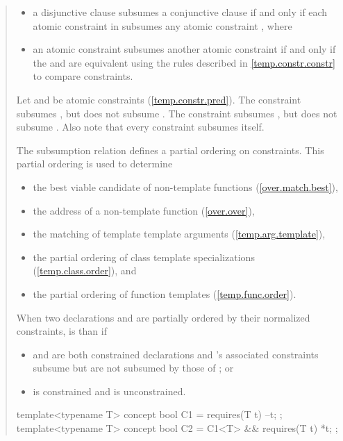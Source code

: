 \begin{quote}
\begin{itemize}
\item a disjunctive clause  subsumes a conjunctive clause
 if and only if each atomic constraint in  subsumes 
any atomic constraint , where

\item an atomic constraint  subsumes another atomic constraint
 if and only if the  and  are equivalent using the
rules described in \ref{temp.constr.constr} to compare constraints.
\end{itemize}
% 
\enterexample
Let  and  be atomic constraints (\ref{temp.constr.pred}).
% 
The constraint  subsumes , 
but  does not subsume . 
% 
The constraint  subsumes , but
 does not subsume . 
% 
Also note that every constraint subsumes itself.
\exitexample


\pnum
The subsumption relation defines a partial ordering on constraints. 
This partial ordering is used to determine
% 
\begin{itemize}
\item the best viable candidate of non-template functions
     (\ref{over.match.best}), 
\item the address of a non-template function
     (\ref{over.over}), 
\item the matching of template template arguments
     (\ref{temp.arg.template}), 
\item the partial ordering of class template specializations
     (\ref{temp.class.order}), and
\item the partial ordering of function templates
     (\ref{temp.func.order}).
\end{itemize}

\pnum
When two declarations  and  are
partially ordered by their normalized constraints,  is 
 than  if
% 
\begin{itemize}
\item {} and  are both constrained
declarations and 's associated constraints subsume but 
are not subsumed by those of ; or

\item {} is constrained and  is
unconstrained. 
\end{itemize}
% 
\enterexample
\begin{codeblock}
template<typename T> concept bool C1 = requires(T t) { --t; };
template<typename T> concept bool C2 = C1<T> && requires(T t) { *t; };


\end{codeblock}
\end{quote}
